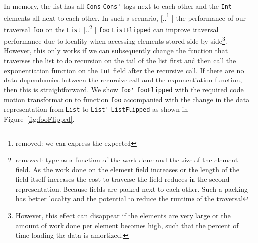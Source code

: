 \documentclass[acmsmall,review,anonymous]{acmart}\settopmatter{printfolios=true,printccs=false,printacmref=false}
\newcommand{\new}[1]{{\color{very-dark-green}{#1}}}
\newcommand{\new}[1]{#1}
\providecommand{\DIFaddtex}[1]{{\protect\color{blue} \sf #1}} %
\providecommand{\DIFdeltex}[1]{{\protect\color{red} [..\footnote{removed: #1} ]}} %
\providecommand{\DIFaddbegin}{} %
\providecommand{\DIFaddend}{} %
\providecommand{\DIFdelbegin}{} %
\providecommand{\DIFdelend}{} %
\providecommand{\DIFadd}[1]{\texorpdfstring{\DIFaddtex{#1}}{#1}} %
\providecommand{\DIFdel}[1]{\texorpdfstring{\DIFdeltex{#1}}{}} %
\newcommand{\DIFscaledelfig}{0.5}
\newlength{\DIFdelgraphicswidth} %
\newlength{\DIFdelgraphicsheight} %
\newcommand{\DIFaddincludegraphics}[2][]{{\color{blue}\fbox{\DIFOincludegraphics[#1]{#2}}}} %
\newcommand{\DIFdelincludegraphics}[2][]{%
\sbox{\DIFdelgraphicsbox}{\DIFOincludegraphics[#1]{#2}}%
\settoboxwidth{\DIFdelgraphicswidth}{\DIFdelgraphicsbox} %
\settoboxtotalheight{\DIFdelgraphicsheight}{\DIFdelgraphicsbox} %
\scalebox{\DIFscaledelfig}{%
\parbox[b]{\DIFdelgraphicswidth}{\usebox{\DIFdelgraphicsbox}\\[-\baselineskip] \rule{\DIFdelgraphicswidth}{0em}}\llap{\resizebox{\DIFdelgraphicswidth}{\DIFdelgraphicsheight}{%
\setlength{\unitlength}{\DIFdelgraphicswidth}%
\begin{picture}(1,1)%
\thicklines\linethickness{2pt} %
{\color[rgb]{1,0,0}\put(0,0){\framebox(1,1){}}}%
{\color[rgb]{1,0,0}\put(0,0){\line( 1,1){1}}}%
{\color[rgb]{1,0,0}\put(0,1){\line(1,-1){1}}}%
\end{picture}%
}\hspace*{3pt}}} %
} %
\DeclareRobustCommand{\DIFaddbegin}{\DIFOaddbegin \let\includegraphics\DIFaddincludegraphics} %
\DeclareRobustCommand{\DIFaddend}{\DIFOaddend \let\includegraphics\DIFOincludegraphics} %
\DeclareRobustCommand{\DIFdelbegin}{\DIFOdelbegin \let\includegraphics\DIFdelincludegraphics} %
\DeclareRobustCommand{\DIFdelend}{\DIFOaddend \let\includegraphics\DIFOincludegraphics} %
\begin{document}
In memory, the list has all \DIFdelbegin %
{\color{red}%
\lstinline|Cons| %
}%
\DIFdelend \DIFaddbegin {\color{blue}%
\lstinline|Cons'| %
}%
\DIFaddend tags next to each other \new{(a unary encoding of array length!)} and the \lstinline|Int| elements all next to each other.
In such a scenario, \DIFdelbegin \DIFdel{we can express the expected }\DIFdelend \DIFaddbegin \DIFadd{the }\DIFaddend performance of our traversal \lstinline|foo| on the \DIFdelbegin %
{\color{red}%
\lstinline|List| %
}%
\DIFdel{type as a 
function of the work done and the size of the element field. As the work done on the element field increases or the length of the 
field itself increases the cost to traverse the field reduces in the second representation. Because fields are packed next to each other.
Such a packing has better locality and the potential to reduce the runtime of the traversal }%
{\color{red}%
\lstinline|foo|%
}%
\DIFdelend \DIFaddbegin {\color{blue}%
\lstinline|ListFlipped| %
}%
\DIFadd{can improve 
traversal performance due to locality when accessing elements stored side-by-side}\footnote{\DIFadd{However, this effect can disappear if the elements are very large or the amount of work done per element becomes high, such that the percent of time loading the data is amortized.}}\DIFaddend .
However, this only works if we
can subsequently change the function that traverses the list to do recursion on the tail of the list first and then call the exponentiation
function on the \lstinline|Int| field after the recursive call. If there are no data dependencies between the recursive call and the exponentiation
function, then this is straightforward. We show \DIFdelbegin %
{\color{red}%
\lstinline|foo'| %
}%
\DIFdelend \DIFaddbegin {\color{blue}%
\lstinline|fooFlipped| %
}%
\DIFaddend with the required code motion transformation to function \lstinline|foo| accompanied
with the change in the data representation from \lstinline|List| to \DIFdelbegin %
{\color{red}%
\lstinline|List'|%
}%
\DIFdelend \DIFaddbegin {\color{blue}%
\lstinline|ListFlipped| %
}%
\DIFadd{as shown in Figure~\ref{fig:fooFlipped}}\DIFaddend .
\end{document}
